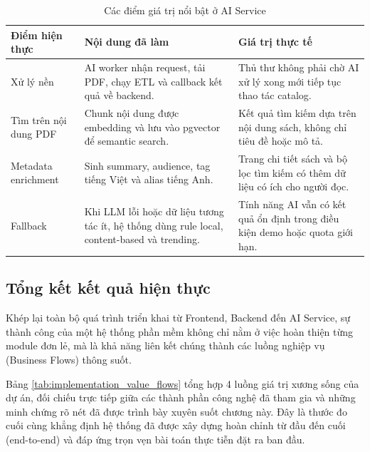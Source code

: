 \begin{table}[H]
\centering
\small
\begin{tabularx}{\textwidth}{|p{3.4cm}|X|p{3.4cm}|}
\hline
\textbf{Điểm hiện thực} & \textbf{Nội dung đã làm} & \textbf{Giá trị thực tế} \\
\hline
Xử lý nền &
AI worker nhận request, tải PDF, chạy ETL và callback kết quả về backend. &
Thủ thư không phải chờ AI xử lý xong mới tiếp tục thao tác catalog. \\
\hline
Tìm trên nội dung PDF &
Chunk nội dung được embedding và lưu vào pgvector để semantic search. &
Kết quả tìm kiếm dựa trên nội dung sách, không chỉ tiêu đề hoặc mô tả. \\
\hline
Metadata enrichment &
Sinh summary, audience, tag tiếng Việt và alias tiếng Anh. &
Trang chi tiết sách và bộ lọc tìm kiếm có thêm dữ liệu có ích cho người đọc. \\
\hline
Fallback &
Khi LLM lỗi hoặc dữ liệu tương tác ít, hệ thống dùng rule local, content-based và trending. &
Tính năng AI vẫn có kết quả ổn định trong điều kiện demo hoặc quota giới hạn. \\
\hline
\end{tabularx}
\caption{Các điểm giá trị nổi bật ở AI Service}
\label{tab:ai_value_highlights}
\end{table}

\subsection{Tổng kết kết quả hiện thực}

Khép lại toàn bộ quá trình triển khai từ Frontend, Backend đến AI Service, sự thành công của một hệ thống phần mềm không chỉ nằm ở việc hoàn thiện từng module đơn lẻ, mà là khả năng liên kết chúng thành các luồng nghiệp vụ (Business Flows) thông suốt.

Bảng \ref{tab:implementation_value_flows} tổng hợp 4 luồng giá trị xương sống của dự án, đối chiếu trực tiếp giữa các thành phần công nghệ đã tham gia và những minh chứng rõ nét đã được trình bày xuyên suốt chương này. Đây là thước đo cuối cùng khẳng định hệ thống đã được xây dựng hoàn chỉnh từ đầu đến cuối (end-to-end) và đáp ứng trọn vẹn bài toán thực tiễn đặt ra ban đầu.


